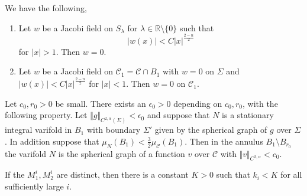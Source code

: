 \documentclass[10pt,a4paper]{amsart}
\begin{document}
\begin{lemma} \label{prelim:GammaBound}
We have the following, 
\begin{enumerate}
    \item Let $w$ be a Jacobi field on $S_\lambda$ for $\lambda\in \mathbb R\setminus\{0\}$ such that 
$$ |w(x)|<C|x|^{\frac{2-n}{2}}$$
for $|x| > 1$.  Then $w=0$.

\item Let $w$ be a Jacobi field on $\mathcal C_1 = \mathcal{C} \cap B_1$ with $w= 0$ on $\Sigma$ and $|w(x)|<C|x|^{\frac{2-n}{2}}$ for $|x| < 1$. Then $w=0$  on $\mathcal C_1$.
\end{enumerate}

\end{lemma}

\begin{prop}\label{prop:FromAllard}
    Let $c_0, r_0 > 0$ be small. There exists an $\epsilon_0 > 0$ depending on $c_0, r_0$, with the following property. Let $\Vert g\Vert_{C^{2,\alpha}(\Sigma)} < \epsilon_0$ and suppose that $N$ is a stationary integral varifold in $B_1$ with boundary $\Sigma'$ given by the spherical graph of $g$ over $\Sigma$. In addition suppose that $\mu_N(B_1) < \frac{3}{2} \mu_\mathcal C (B_1)$. 
    Then in the annulus $B_1\setminus B_{r_0}$ the varifold $N$ is the spherical graph of a function $v$ over $\mathcal{C}$ with $\Vert v\Vert_{C^{2,\alpha}} < c_0$. 
\end{prop}

\begin{lemma}\label{lemma:k_i bounded}
    If the $M^i_1, M^i_2$ are distinct, then 
    there is a constant $K > 0$ such that $k_i < K$ for all sufficiently large $i$. 
\end{lemma}
\end{document}
